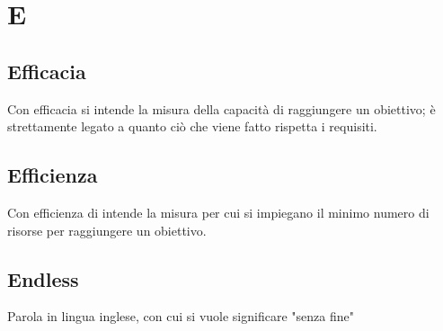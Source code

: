\section{E}
	\subsection{Efficacia}  
		Con efficacia si intende la misura della capacità di raggiungere un obiettivo; è strettamente legato a quanto ciò che viene fatto rispetta i requisiti.
	\subsection{Efficienza}  
		Con efficienza di intende la misura per cui si impiegano il minimo numero di risorse per raggiungere un obiettivo.
	\subsection{Endless}  
		Parola in lingua inglese, con cui si vuole significare "senza fine"


\newpage